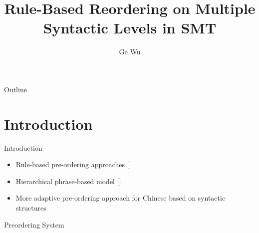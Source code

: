 \documentclass[18pt]{beamer}
\title{Rule-Based Reordering on Multiple Syntactic Levels in SMT}
\author{Ge Wu}
\institute{Institute for Anthropomatics and Robotics (IAR)}
\begin{document}

\begin{frame}
\titlepage
\end{frame}

\begin{frame}{Outline}
\tableofcontents
\end{frame}

\section{Introduction}
\begin{frame}{Introduction}
\begin{itemize}
\item Rule-based pre-ordering approaches {\scriptsize [\cite{short, long, tree}]}
\item Hierarchical phrase-based model {\scriptsize [\cite{hier}]}
\item More adaptive pre-ordering approach for Chinese based on syntactic structures
\end{itemize}
\end{frame}

\begin{frame}{Preordering System}
\begin{figure}
\centering

\end{figure}
\end{frame}
\end{document}
